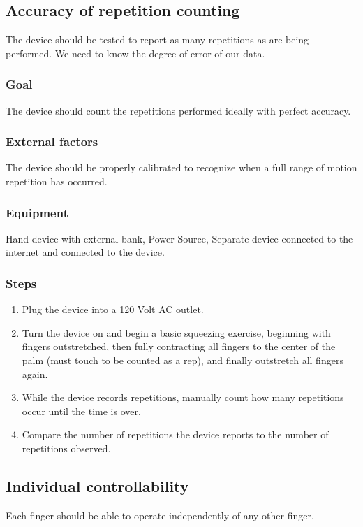 \documentclass{article}
\begin{document}
\subsection{Accuracy of repetition counting}
The device should be tested to report as many repetitions as are being performed. We need to know the degree of error of our data.

\subsubsection{Goal} The device should count the repetitions performed ideally with perfect accuracy.

\subsubsection{External factors} The device should be properly calibrated to recognize when a full range of motion repetition has occurred.

\subsubsection{Equipment} Hand device with external bank, Power Source, Separate device connected to the internet and connected to the device.

\subsubsection{Steps}
\begin{enumerate}
\item Plug the device into a 120 Volt AC outlet.
\item Turn the device on and begin a basic squeezing exercise, beginning with fingers outstretched, then fully contracting all fingers to the center of the palm (must touch to be counted as a rep), and finally outstretch all fingers again.
\item While the device records repetitions, manually count how many repetitions occur until the time is over.
\item Compare the number of repetitions the device reports to the number of repetitions observed.
\end{enumerate}

\subsection{Individual controllability}
Each finger should be able to operate independently of any other finger.
\end{document}

